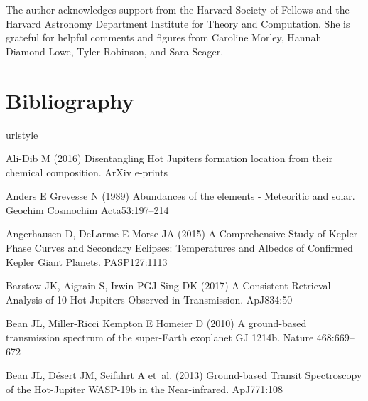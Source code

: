 \documentclass[graybox,natbib,nosecnum]{svmult}
\newcommand*\apj{ApJ}
\newcommand*\gca{Geochim Cosmochim Acta}
\newcommand*\nat{Nature}
\newcommand*\pasp{PASP}
\begin{document}
\begin{acknowledgement}
The author acknowledges support from the Harvard Society of Fellows and the Harvard Astronomy Department Institute for Theory and Computation. She is grateful for helpful comments and figures from Caroline Morley, Hannah Diamond-Lowe, Tyler Robinson, and Sara Seager.
\end{acknowledgement}

\section{Bibliography}

\begin{thebibliography}{110}
\providecommand{\natexlab}[1]{#1}
\providecommand{\url}[1]{{#1}}
\providecommand{\urlprefix}{URL }
\expandafter\ifx\csname urlstyle\endcsname\relax
  \providecommand{\doi}[1]{DOI~\discretionary{}{}{}#1}\else
  \providecommand{\doi}{DOI~\discretionary{}{}{}\begingroup
  \urlstyle{rm}\Url}\fi
\providecommand{\eprint}[2][]{\url{#2}}

{Ali-Dib} M (2016) {Disentangling Hot Jupiters formation location from their
  chemical composition}. ArXiv e-prints

{Anders} E {Grevesse} N (1989) {Abundances of the elements - Meteoritic and
  solar}. \gca 53:197--214

{Angerhausen} D, {DeLarme} E {Morse} JA (2015) {A Comprehensive Study of Kepler
  Phase Curves and Secondary Eclipses: Temperatures and Albedos of Confirmed
  Kepler Giant Planets}. \pasp 127:1113

{Barstow} JK, {Aigrain} S, {Irwin} PGJ {Sing} DK (2017) {A Consistent Retrieval
  Analysis of 10 Hot Jupiters Observed in Transmission}. \apj 834:50

{Bean} JL, {Miller-Ricci Kempton} E {Homeier} D (2010) {A ground-based
  transmission spectrum of the super-Earth exoplanet GJ 1214b}. \nat
  468:669--672

{Bean} JL, {D{\'e}sert} JM, {Seifahrt} A et~al. (2013) {Ground-based Transit
  Spectroscopy of the Hot-Jupiter WASP-19b in the Near-infrared}. \apj 771:108


\end{thebibliography}
\end{document}
